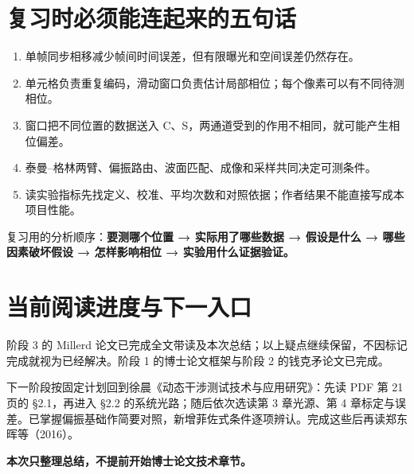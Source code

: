 \documentclass[UTF8,fontset=fandol,11pt,a4paper]{ctexart}
\begin{document}
\section{复习时必须能连起来的五句话}

\begin{enumerate}
\item 单帧同步相移减少帧间时间误差，但有限曝光和空间误差仍然存在。
\item 单元格负责重复编码，滑动窗口负责估计局部相位；每个像素可以有不同待测相位。
\item 窗口把不同位置的数据送入 C、S，两通道受到的作用不相同，就可能产生相位偏差。
\item 泰曼–格林两臂、偏振路由、波面匹配、成像和采样共同决定可测条件。
\item 读实验指标先找定义、校准、平均次数和对照依据；作者结果不能直接写成本项目性能。

\end{enumerate}
复习用的分析顺序：\textbf{要测哪个位置 → 实际用了哪些数据 → 假设是什么 → 哪些因素破坏假设 → 怎样影响相位 → 实验用什么证据验证。}

\section{当前阅读进度与下一入口}

阶段 3 的 Millerd 论文已完成全文带读及本次总结；以上疑点继续保留，不因标记完成就视为已经解决。阶段 1 的博士论文框架与阶段 2 的钱克矛论文已完成。

下一阶段按固定计划回到徐晨《动态干涉测试技术与应用研究》：先读 PDF 第 21 页的 §2.1，再进入 §2.2 的系统光路；随后依次选读第 3 章光源、第 4 章标定与误差。已掌握偏振基础作简要对照，新增菲佐式条件逐项辨认。完成这些后再读郑东晖等（2016）。

\textbf{本次只整理总结，不提前开始博士论文技术章节。}
\end{document}
